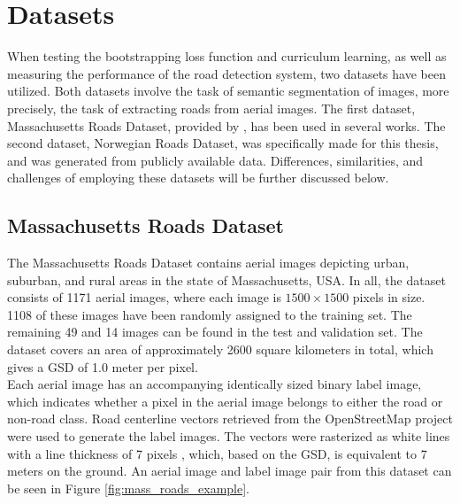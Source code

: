 \section{Datasets}
\label{sec:datasets}
  When testing the bootstrapping loss function and curriculum learning, as well as measuring the performance of the road detection system, two datasets have been utilized. Both datasets involve the task of semantic segmentation of images, more precisely, the task of extracting roads from aerial images. The first dataset, Massachusetts Roads Dataset, provided by \cite{MnihThesis}, has been used in several works. The second dataset, Norwegian Roads Dataset, was specifically made for this thesis, and was generated from publicly available data. Differences, similarities, and challenges of employing these datasets will be further discussed below.\\

\subsection{Massachusetts Roads Dataset}
The Massachusetts Roads Dataset contains aerial images depicting urban, suburban, and rural areas in the state of Massachusetts, USA. In all, the dataset consists of 1171 aerial images, where each image is $1500\times 1500$ pixels in size. 1108 of these images have been randomly assigned to the training set. The remaining 49 and 14 images can be found in the test and validation set. The dataset covers an area of approximately 2600 square kilometers in total, which gives a \ac{GSD} of 1.0 meter per pixel.\\

Each aerial image has an accompanying identically sized binary label image, which indicates whether a pixel in the aerial image belongs to either the road or non-road class. Road centerline vectors retrieved from the OpenStreetMap project were used to generate the label images. The vectors were rasterized as white lines with a line thickness of 7 pixels \citep{MnihThesis}, which, based on the \ac{GSD}, is equivalent to 7 meters on the ground. An aerial image and label image pair from this dataset can be seen in Figure \ref{fig:mass_roads_example}.\\

